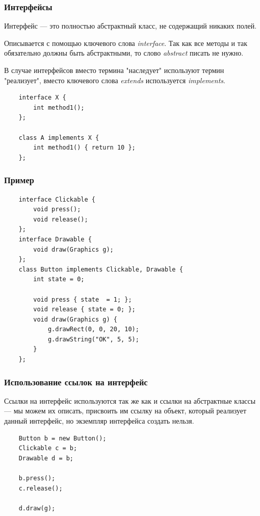 \begin{frame}[fragile]
	\frametitle{Интерфейсы}
	Интерфейс --- это полностью абстрактный класс, не содержащий никаких полей.

	\medskip
	Описывается с помощью ключевого слова \emph{interface}. Так как все методы и так обязательно должны быть абстрактными, то слово \emph{abstract} писать не нужно.

	\medskip
	В случае интерфейсов вместо термина "наследует" используют термин "реализует", вместо ключевого слова \emph{extends} используется \emph{implements}.

	\begin{verbatim}
	interface X {
	    int method1();
	};

	class A implements X {
	    int method1() { return 10 };
	};
	\end{verbatim}
\end{frame}

\begin{frame}[fragile]
	\frametitle{Пример}

	\begin{verbatim}
	interface Clickable {
	    void press();
	    void release();
	};
	interface Drawable {
	    void draw(Graphics g);
	};
	class Button implements Clickable, Drawable {
	    int state = 0;

	    void press { state  = 1; };
	    void release { state = 0; };
	    void draw(Graphics g) {
	        g.drawRect(0, 0, 20, 10);
	        g.drawString("OK", 5, 5);
	    }
	};
	\end{verbatim}

\end{frame}

\begin{frame}[fragile]
	\frametitle{Использование ссылок на интерфейс}

	Ссылки на интерфейс используются так же как и ссылки на абстрактные классы --- мы можем их описать, присвоить им ссылку на объект, который реализует данный интерфейс, но экземпляр интерфейса создать нельзя.

	\begin{verbatim}
	Button b = new Button();
	Clickable c = b;
	Drawable d = b;

	b.press();
	c.release();

	d.draw(g);
	\end{verbatim}
\end{frame}

